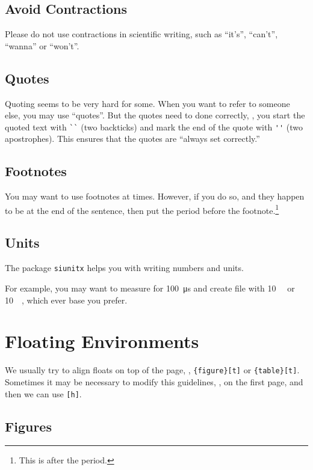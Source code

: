 \subsection{Avoid Contractions}

Please do not use contractions in scientific writing, such as
``it's'', ``can't'', ``wanna'' or  ``won't''.

\subsection{Quotes}

Quoting seems to be very hard for some. When you want to refer to
someone else, you may use ``quotes''. But the quotes need to done
correctly, \ie, you start the quoted text with \verb|``| (two
backticks) and mark the end of the quote with \verb|''| (two
apostrophes). This ensures that the quotes are ``always set
correctly.''

\subsection{Footnotes}

You may want to use footnotes at times. However, if you do so, and
they happen to be at the end of the sentence, then put the period
before the footnote.\footnote{This is after the period.}

\subsection{Units}

The package \verb|siunitx| helps you with writing numbers and units.

For example, you may want to measure for \SI{100}{\micro\second} and
create file with \SI{10}{\gibi\byte} or \SI{10}{\giga\byte}, which
ever base you prefer.

\section{Floating Environments}

We usually try to align floats on top of the page, \eg,
\verb|{figure}[t]| or \verb|{table}[t]|. Sometimes it may be necessary
to modify this guidelines, \eg, on the first page, and then we can use
\verb|[h]|.

\subsection{Figures}

